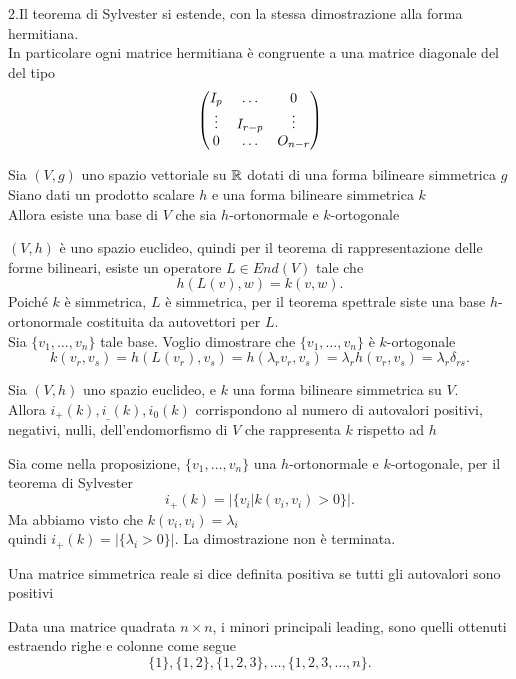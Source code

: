 \documentclass[12px]{article}
\begin{document}
	2.Il teorema di Sylvester si estende, con la stessa dimostrazione alla forma hermitiana.\\
	In particolare ogni matrice hermitiana è congruente a una matrice diagonale del del tipo
	\[
		\begin{pmatrix}I_p & \ldots & 0\\
			\vdots & I_{r-p} & \vdots\\
		0 & \ldots & O_{n-r}\end{pmatrix}
	\] 
\begin{prop}
	Sia $(V,g)$  uno spazio vettoriale su $\mathbb{R}$ dotati di una forma bilineare simmetrica $g$\\
	Siano dati un prodotto scalare $h$ e una forma bilineare simmetrica $k$\\
	Allora esiste una base di  $V$ che sia $h$-ortonormale e $k$-ortogonale
\end{prop}
\begin{dimo}
	$(V,h)$ è uno spazio euclideo, quindi per il teorema di rappresentazione delle forme bilineari, esiste un operatore $L\in End(V)$ tale che
	\[
	h(L(v),w) = k(v,w)
	.\] 
	Poiché $k$ è simmetrica, $L$ è simmetrica, per il teorema spettrale siste una base $h$-ortonormale costituita da autovettori per $L$.\\
	Sia  $\{v_1,\ldots,v_n\}$ tale base. Voglio dimostrare che $\{v_1,\ldots,v_n\}$ è $k$-ortogonale
	\[
		k(v_r,v_s) = h(L(v_r),v_s) = h(\lambda_r v_r,v_s) = \lambda_rh(v_r,v_s) = \lambda_r \delta_{rs}
	.\] 
\end{dimo}
\begin{coro}
	Sia $(V,h)$ uno spazio euclideo, e $k$ una forma bilineare simmetrica  su $V$.\\
	Allora $i_+(k), i_\_(k), i_0(k)$ corrispondono al numero di autovalori positivi, negativi, nulli, dell'endomorfismo di  $V$ che rappresenta $k$ rispetto ad $h$
\end{coro}
\begin{dimo}
	Sia come nella proposizione, $\{v_1,\ldots,v_n\}$ una $h$-ortonormale e $k$-ortogonale, per il teorema di Sylvester
	\[
		i_+(k) = |\{v_i|k(v_i,v_i)> 0\}|
	.\] 
	Ma abbiamo visto che $k(v_i,v_i) = \lambda_i$\\
	quindi $i_+(k) = |\{ \lambda_i>0\}|$.
	La dimostrazione non è terminata.
\end{dimo}
\begin{defi}
	Una matrice simmetrica reale si dice definita positiva se tutti gli autovalori sono positivi
\end{defi}
\begin{defi}
	Data una matrice quadrata $n\times n$, i minori principali leading, sono quelli ottenuti estraendo righe e colonne come segue
	\[
		\{1\},\{1,2\},\{1,2,3\},\ldots,\{1,2,3,\ldots,n\}
	.\] 
\end{defi}
\end{document}
